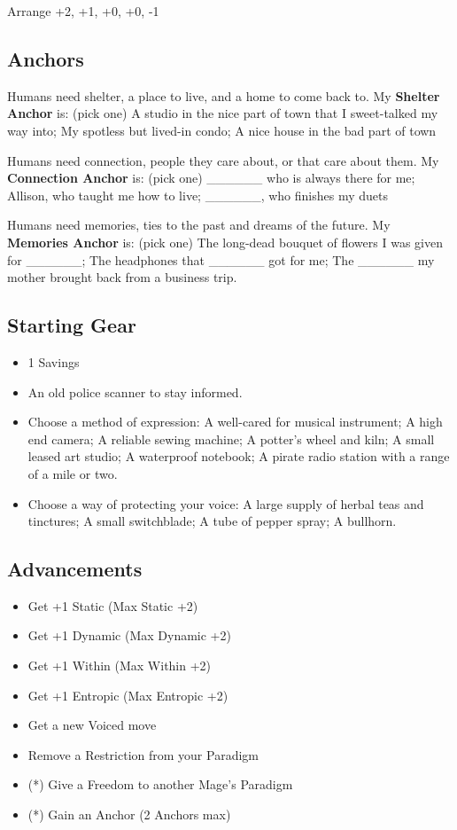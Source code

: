 \documentclass[
  oneside,
  statementpaper,
  9pt]{memoir}
\begin{document}
Arrange +2, +1, +0, +0, -1

\hypertarget{anchors-7}{%
\subsection{Anchors}\label{anchors-7}}

Humans need shelter, a place to live, and a home to come back to. My
\textbf{Shelter Anchor} is: (pick one) A studio in the nice part of town
that I sweet-talked my way into; My spotless but lived-in condo; A nice
house in the bad part of town

Humans need connection, people they care about, or that care about them.
My \textbf{Connection Anchor} is: (pick one) \_\_\_\_\_\_ who is always
there for me; Allison, who taught me how to live; \_\_\_\_\_\_, who
finishes my duets

Humans need memories, ties to the past and dreams of the future. My
\textbf{Memories Anchor} is: (pick one) The long-dead bouquet of flowers
I was given for \_\_\_\_\_\_; The headphones that \_\_\_\_\_\_ got for
me; The \_\_\_\_\_\_ my mother brought back from a business trip.

\hypertarget{starting-gear-7}{%
\subsection{Starting Gear}\label{starting-gear-7}}

\begin{itemize}
\tightlist
\item
  1 Savings
\item
  An old police scanner to stay informed.
\item
  Choose a method of expression: A well-cared for musical instrument; A
  high end camera; A reliable sewing machine; A potter's wheel and kiln;
  A small leased art studio; A waterproof notebook; A pirate radio
  station with a range of a mile or two.
\item
  Choose a way of protecting your voice: A large supply of herbal teas
  and tinctures; A small switchblade; A tube of pepper spray; A
  bullhorn.
\end{itemize}

\hypertarget{advancements-7}{%
\subsection{Advancements}\label{advancements-7}}

\begin{itemize}
\tightlist
\item
  Get +1 Static (Max Static +2)
\item
  Get +1 Dynamic (Max Dynamic +2)
\item
  Get +1 Within (Max Within +2)
\item
  Get +1 Entropic (Max Entropic +2)
\item
  Get a new Voiced move
\item
  Remove a Restriction from your Paradigm
\item
  (*) Give a Freedom to another Mage's Paradigm
\item
  (*) Gain an Anchor (2 Anchors max)
\end{itemize}
\end{document}
